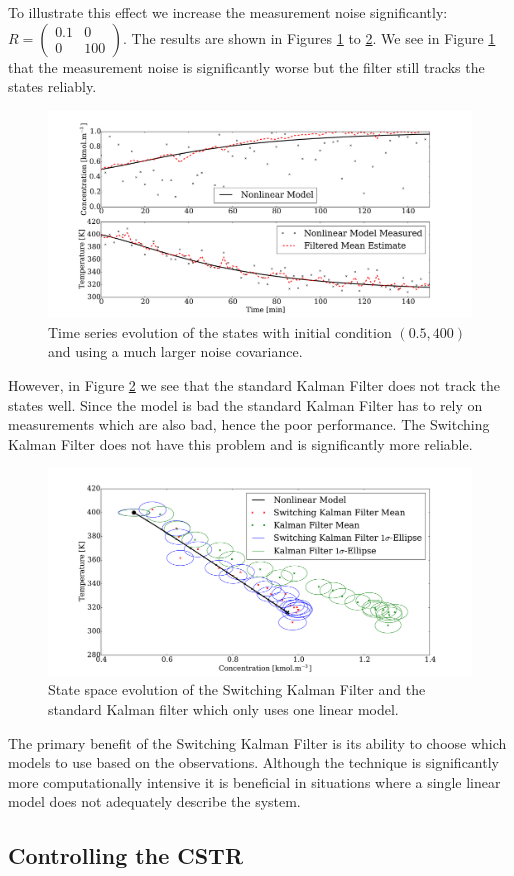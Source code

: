 \documentclass[../masters.tex]{subfiles}
\begin{document}
To illustrate this effect we increase the measurement noise significantly: $R=\begin{pmatrix}
0.1 & 0 \\ 0 & 100
\end{pmatrix}$. The results are shown in Figures  \ref{fig_7mod_t_m2_b} to \ref{fig_7mod_p_m2_b}. We see in Figure \ref{fig_7mod_t_m2_b} that the measurement noise is significantly worse but the filter still tracks the states reliably.
\begin{figure}[H] 
\centering
\includegraphics[scale=0.3]{skf_s7_t_m2_b.pdf}
\caption{Time series evolution of the states with initial condition $(0.5, 400)$ and using a much larger noise covariance.}
\label{fig_7mod_t_m2_b}
\end{figure}
However, in Figure \ref{fig_7mod_p_m2_b} we see that the standard Kalman Filter does not track the states well. Since the model is bad the standard Kalman Filter has to rely on measurements which are also bad, hence the poor performance. The Switching Kalman Filter does not have this problem and is significantly more reliable.
\begin{figure}[H] 
\centering
\includegraphics[scale=0.3]{skf_s7_p_m2_b.pdf}
\caption{State space evolution of the Switching Kalman Filter and the standard Kalman filter which only uses one linear model.}
\label{fig_7mod_p_m2_b}
\end{figure}
The primary benefit of the Switching Kalman Filter is its ability to choose which models to use based on the observations. Although the technique is significantly more computationally intensive it is beneficial in situations where a single linear model does not adequately describe the system. 






\subsection{Controlling the CSTR}




\end{document}
